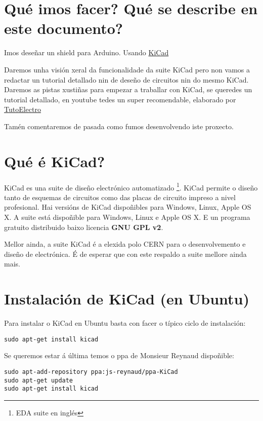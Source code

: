 \section{Qué imos facer? Qué se describe en este
documento?}\label{quuxe9-imos-facer-quuxe9-se-describe-en-este-documento}

Imos deseñar un shield para Arduino. Usando
\href{http://www.kicad-pcb.org/}{KiCad}

Daremos unha visión xeral da funcionalidade da suite KiCad pero non
vamos a redactar un tutorial detallado nin de deseño de circuitos nin do
mesmo KiCad. Daremos as pistas xustiñas para empezar a traballar con
KiCad, se queredes un tutorial detallado, en youtube tedes un super
recomendable, elaborado por
\href{https://www.youtube.com/playlist?list=PL1Hs_F1k2mdRVYDtdWd7tQKDZTfxop7np}{TutoElectro}

Tamén comentaremos de pasada como fumos desenvolvendo iste proxecto.

\section{Qué é KiCad?}\label{quuxe9-uxe9-kicad}

KiCad es una suite de diseño electrónico automatizado \footnote{EDA
  suite en inglés}. KiCad permite o diseño tanto de esquemas de
circuitos como das placas de circuito impreso a nivel profesional. Hai
versións de KiCad dispoñibles para Windows, Linux, Apple OS X. A suite
está dispoñible para Windows, Linux e Apple OS X. E un programa gratuito
distribuido baixo licencia \textbf{GNU GPL v2}.

Mellor ainda, a suite KiCad é a elexida polo CERN para o desenvolvemento
e diseño de electrónica. É de esperar que con este respaldo a suite
mellore ainda mais.

\section{Instalación de KiCad (en
Ubuntu)}\label{instalaciuxf3n-de-kicad-en-ubuntu}

Para instalar o KiCad en Ubuntu basta con facer o típico ciclo de
instalación:

\begin{verbatim}
sudo apt-get install kicad
\end{verbatim}

Se queremos estar á última temos o ppa de Monsieur Reynaud dispoñible:

\begin{verbatim}
sudo apt-add-repository ppa:js-reynaud/ppa-KiCad
sudo apt-get update
sudo apt-get install kicad
\end{verbatim}

